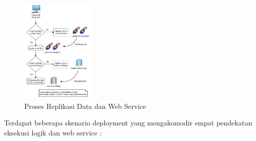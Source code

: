 \begin{figure}[H]
    \centering
    \includegraphics[height=5cm]{images/replication}
    \caption{Proses Replikasi Data dan Web Service}
    \label{fig:replication}
\end{figure}

Terdapat beberapa skenario deployment yang mengakomodir empat pendekatan eksekusi logik dan web service :
